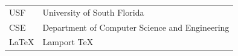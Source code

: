 
{
\singlespace
\renewcommand{\arraystretch}{1.2}%
\begin{tabularx}{\linewidth}{ l X }
  USF & University of South Florida  \\
  CSE & Department of Computer Science and Engineering\\
  LaTeX &  Lamport TeX \\
\end{tabularx}
}